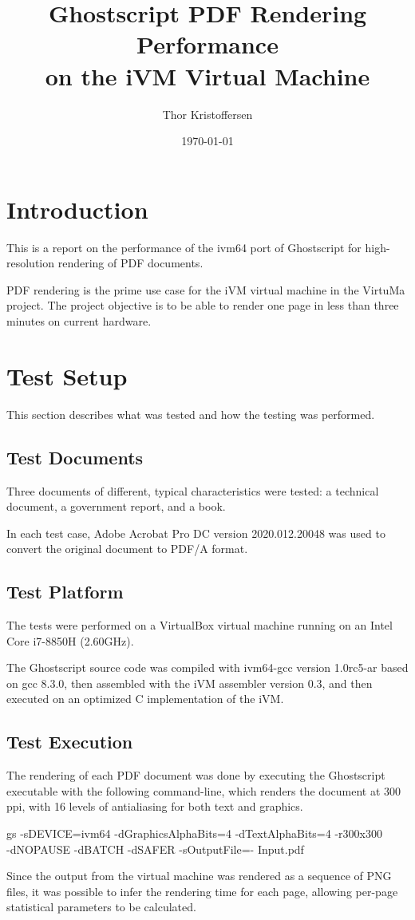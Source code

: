 \documentclass[a4paper,11pt]{article}
\author{Thor Kristoffersen}
\date{\today}
\title{Ghostscript PDF Rendering Performance\\on the iVM Virtual Machine}
\begin{document}
\maketitle

\section{Introduction}

This is a report on the performance of the ivm64 port of Ghostscript for high-resolution rendering of PDF documents.

PDF rendering is the prime use case for the iVM virtual machine in the VirtuMa project.
The project objective is to be able to render one page in less than three minutes on current hardware.

\section{Test Setup}
\label{sec:test setup}

This section describes what was tested and how the testing was performed.

\subsection{Test Documents}

Three documents of different, typical characteristics were tested: a technical document, a government report, and a book.

In each test case, Adobe Acrobat Pro DC version 2020.012.20048 was used to convert the original document to PDF/A format.

\subsection{Test Platform}

The tests were performed on a VirtualBox virtual machine running on an Intel Core i7-8850H (2.60GHz).

The Ghostscript source code was compiled with ivm64-gcc version 1.0rc5-ar based on gcc 8.3.0, then assembled with the iVM assembler version 0.3, and then executed on an optimized C implementation of the iVM.

\subsection{Test Execution}

The rendering of each PDF document was done by executing the Ghostscript executable with the following command-line, which renders the document at 300 ppi, with 16 levels of antialiasing for both text and graphics.
\begin{trivlist}\ttfamily
\item gs -sDEVICE=ivm64 -dGraphicsAlphaBits=4 -dTextAlphaBits=4 -r300x300 \\ -dNOPAUSE -dBATCH -dSAFER -sOutputFile=- Input.pdf
\end{trivlist}
Since the output from the virtual machine was rendered as a sequence of PNG files, it was possible to infer the rendering time for each page, allowing per-page statistical parameters to be calculated.
\end{document}
